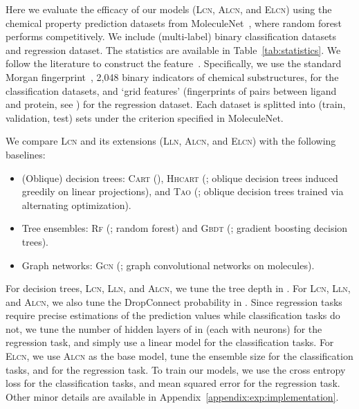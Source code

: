 \documentclass{article} \usepackage{iclr2020_conference,times}
\begin{document}
Here we evaluate the efficacy of our models (\textsc{Lcn}, \textsc{Alcn}, and \textsc{Elcn}) using the chemical property prediction datasets from MoleculeNet~\citep{wu2018moleculenet}, where random forest performs competitively. We include  (multi-label) binary classification datasets and  regression dataset. The statistics are available in Table~\ref{tab:statistics}. We follow the literature to construct the feature~\citep{wu2018moleculenet}. Specifically, we use the standard Morgan fingerprint~\citep{rogers2010extended}, 2,048 binary indicators of chemical substructures, for the classification datasets, and `grid features' (fingerprints of pairs between ligand and protein, see \citet{wu2018moleculenet}) for the regression dataset. Each dataset is splitted into (train, validation, test) sets under the criterion specified in MoleculeNet. 

We compare \textsc{Lcn} and its extensions (\textsc{Lln}, \textsc{Alcn}, and \textsc{Elcn}) with the following baselines: 
\begin{itemize}[leftmargin=4mm]
\vspace{-2mm}
    \item (Oblique) decision trees: \textsc{Cart} (\citet{cart84}), \textsc{Hhcart} (\citet{wickramarachchi2016hhcart}; oblique decision trees induced greedily on linear projections), and \textsc{Tao} (\citet{carreira2018alternating}; oblique decision trees trained via alternating optimization).
\vspace{-1mm}
    \item Tree ensembles: \textsc{Rf} (\citet{breiman2001random}; random forest) and \textsc{Gbdt} (\citet{friedman2001greedy}; gradient boosting decision trees).
\vspace{-1mm}
    \item Graph networks: \textsc{Gcn} (\citet{duvenaud2015convolutional}; graph convolutional networks on molecules). 
\vspace{-2mm}
\end{itemize}
For decision trees, \textsc{Lcn}, \textsc{Lln}, and \textsc{Alcn}, we tune the tree depth in . For \textsc{Lcn}, \textsc{Lln}, and \textsc{Alcn}, we also tune the DropConnect probability in . Since regression tasks require precise estimations of the prediction values while classification tasks do not, we tune the number of hidden layers of  in  (each with  neurons) for the regression task, and simply use a linear model  for the classification tasks. For \textsc{Elcn}, we use \textsc{Alcn} as the base model, tune the ensemble size  for the classification tasks, and  for the regression task. To train our models, we use the cross entropy loss for the classification tasks, and mean squared error for the regression task. Other minor details are available in Appendix~\ref{appendix:exp:implementation}.
\end{document}
